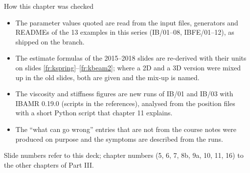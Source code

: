 \documentclass[aspectratio=169,11pt]{beamer}
\begin{document}
\begin{frame}{How this chapter was checked}
\label{fr:checked}
\begin{itemize}
  \item The parameter values quoted are read from the input files, generators and READMEs of the 13 examples in this series (IB/01--08, IBFE/01--12), as shipped on the  branch.
  \item The estimate formulas of the 2015--2018 slides are re-derived with their units on slides \ref{fr:kspring}--\ref{fr:kbeam2}; where a 2D and a 3D version were mixed up in the old slides, both are given and the mix-up is named.
  \item The viscosity and stiffness figures are new runs of IB/01 and IB/03 with IBAMR 0.19.0 (scripts in the references), analysed from the  position files with a short Python script that chapter 11 explains.
  \item The ``what can go wrong'' entries that are not from the course notes were produced on purpose and the symptoms are described from the runs.
\end{itemize}
\vspace{2mm}
\begin{punchbox}
\small Slide numbers refer to this deck; chapter numbers (5, 6, 7, 8b, 9a, 10, 11, 16) to the other chapters of Part III.
\end{punchbox}
\end{frame}
\end{document}

